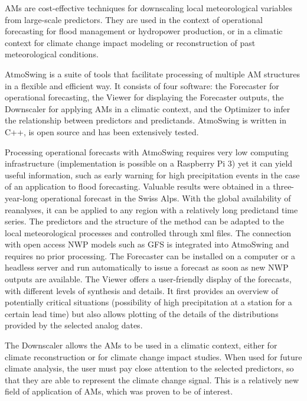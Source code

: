 \documentclass[gmd]{copernicus}
\begin{document}
\label{sec:conclusions}

AMs are cost-effective techniques for downscaling local meteorological variables from large-scale predictors. They are used in the context of operational forecasting for flood management or hydropower production, or in a climatic context for climate change impact modeling or reconstruction of past meteorological conditions. 

AtmoSwing is a suite of tools that facilitate processing of multiple AM structures in a flexible and efficient way. It consists of four software: the Forecaster for operational forecasting, the Viewer for displaying the Forecaster outputs, the Downscaler for applying AMs in a climatic context, and the Optimizer to infer the relationship between predictors and predictands. AtmoSwing is written in C++, is open source and has been extensively tested.

Processing operational forecasts with AtmoSwing requires very low computing infrastructure (implementation is possible on a Raspberry Pi 3) yet it can yield useful information, such as early warning for high precipitation events in the case of an application to flood forecasting. Valuable results were obtained in a three-year-long operational forecast in the Swiss Alps. With the global availability of reanalyses, it can be applied to any region with a relatively long predictand time series. The predictors and the structure of the method can be adapted to the local meteorological processes and controlled through xml files. The connection with open access NWP models such as GFS is integrated into AtmoSwing and requires no prior processing. The Forecaster can be installed on a computer or a headless server and run automatically to issue a forecast as soon as new NWP outputs are available. The Viewer offers a user-friendly display of the forecasts, with different levels of synthesis and details. It first provides an overview of potentially critical situations (possibility of high precipitation at a station for a certain lead time) but also allows plotting of the details of the distributions provided by the selected analog dates.

The Downscaler allows the AMs to be used in a climatic context, either for climate reconstruction or for climate change impact studies. When used for future climate analysis, the user must pay close attention to the selected predictors, so that they are able to represent the climate change signal. This is a relatively new field of application of AMs, which was proven to be of interest.
\end{document}
